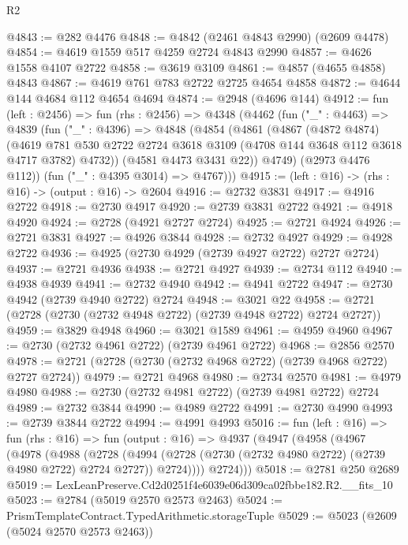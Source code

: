 \begin{lexlean}{R2}
\begin{coremodule}
@4843 := @282 @4476
@4848 := @4842 (@2461 @4843 @2990) (@2609 @4478)
@4854 := @4619 @1559 @517 @4259 @2724 @4843 @2990
@4857 := @4626 @1558 @4107 @2722
@4858 := @3619 @3109
@4861 := @4857 (@4655 @4858) @4843
@4867 := @4619 @761 @783 @2722 @2725 @4654 @4858
@4872 := @4644 @144 @4684 @112 @4654 @4694
@4874 := @2948 (@4696 @144)
@4912 := fun (left : @2456) =>
  fun (rhs : @2456) =>
  @4348
    (@4462
      (fun ("_" : @4463) =>
      @4839
        (fun ("_" : @4396) =>
        @4848
          (@4854
            (@4861
              (@4867
                (@4872 @4874)
                (@4619
                  @781
                  @530
                  @2722
                  @2724
                  @3618
                  @3109
                  (@4708 @144 @3648 @112 @3618 @4717 @3782)
                  @4732))
              (@4581 @4473 @3431 @22))
            @4749)
          (@2973 @4476 @112))
        (fun ("_" : @4395 @3014) => @4767)))
@4915 := (left : @16) -> (rhs : @16) -> (output : @16) -> @2604
@4916 := @2732 @3831
@4917 := @4916 @2722
@4918 := @2730 @4917
@4920 := @2739 @3831 @2722
@4921 := @4918 @4920
@4924 := @2728 (@4921 @2727 @2724)
@4925 := @2721 @4924
@4926 := @2721 @3831
@4927 := @4926 @3844
@4928 := @2732 @4927
@4929 := @4928 @2722
@4936 := @4925 (@2730 @4929 (@2739 @4927 @2722) @2727 @2724)
@4937 := @2721 @4936
@4938 := @2721 @4927
@4939 := @2734 @112
@4940 := @4938 @4939
@4941 := @2732 @4940
@4942 := @4941 @2722
@4947 := @2730 @4942 (@2739 @4940 @2722) @2724
@4948 := @3021 @22
@4958 := @2721 (@2728 (@2730 (@2732 @4948 @2722) (@2739 @4948 @2722) @2724 @2727))
@4959 := @3829 @4948
@4960 := @3021 @1589
@4961 := @4959 @4960
@4967 := @2730 (@2732 @4961 @2722) (@2739 @4961 @2722)
@4968 := @2856 @2570
@4978 := @2721 (@2728 (@2730 (@2732 @4968 @2722) (@2739 @4968 @2722) @2727 @2724))
@4979 := @2721 @4968
@4980 := @2734 @2570
@4981 := @4979 @4980
@4988 := @2730 (@2732 @4981 @2722) (@2739 @4981 @2722) @2724
@4989 := @2732 @3844
@4990 := @4989 @2722
@4991 := @2730 @4990
@4993 := @2739 @3844 @2722
@4994 := @4991 @4993
@5016 := fun (left : @16) =>
  fun (rhs : @16) =>
  fun (output : @16) =>
  @4937
    (@4947
      (@4958
        (@4967
          (@4978
            (@4988
              (@2728
                (@4994 (@2728 (@2730 (@2732 @4980 @2722) (@2739 @4980 @2722) @2724 @2727)) @2724))))
          @2724)))
@5018 := @2781 @250 @2689
@5019 := LexLeanPreserve.Cd2d0251f4e6039e06d309ca02fbbe182.R2.__fits_10
@5023 := @2784 (@5019 @2570 @2573 @2463)
@5024 := PrismTemplateContract.TypedArithmetic.storageTuple
@5029 := @5023 (@2609 (@5024 @2570 @2573 @2463))

\end{coremodule}
\end{lexlean}
